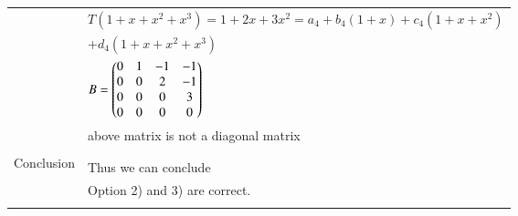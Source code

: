 \documentclass[journal,12pt]{IEEEtran}
\begin{document}
\begin{longtable}{|l|l|}
&  
$T(1+x+x^2+x^3) = 1+2x+3x^2 = a_4+b_4(1+x)+c_4(1+x+x^2)$\\
&
\qquad\qquad\qquad\qquad+$d_4(1+x+x^2+x^3)$\\
&
\qquad\qquad\qquad $B=\begin{pmatrix}0&1&-1&-1\\0&0&2&-1\\0&0&0&3\\0&0&0&0\end{pmatrix}$\\
&
above matrix is not a diagonal matrix\\
&\\
\hline
\multirow{3}{*}{Conclusion} & \\
&
Thus we can conclude \\
&
Option 2) and 3) are correct.\\
&\\
\hline
\end{longtable}
\end{document}
